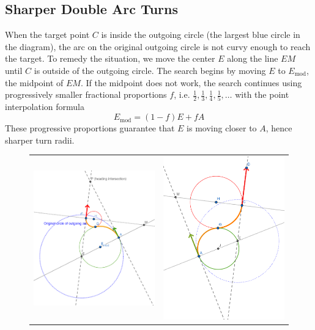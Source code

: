 \documentclass{article}
\begin{document}
\subsection*{Sharper Double Arc Turns}

When the target point $C$ is inside the outgoing circle (the largest blue circle in the diagram), the arc on the 
original outgoing circle is not curvy enough to reach the target. To remedy the situation, we move the center $E$
along the line $EM$ until $C$ is outside of the outgoing circle. The search begins by moving $E$ to $E_\text{mod}$, 
the midpoint of $EM$. If the midpoint does not work, the search continues using progressively smaller fractional proportions 
$f$, i.e. $\frac12, \frac13, \frac14, \frac15, \ldots$ with the point interpolation formula $$E_\text{mod} = (1-f)E + fA$$
These progressive proportions guarantee that $E$ is moving closer to $A$, hence sharper turn radii.

\begin{figure}[hbt]
  \begin{tabular}{cc}
\includegraphics[width=6cm]{screenshots/DoubleArcModCenter.png} &
\includegraphics[width=6cm]{screenshots/DoubleArcModCenterDiverging.png}
\end{tabular}
\end{figure}
\end{document}
